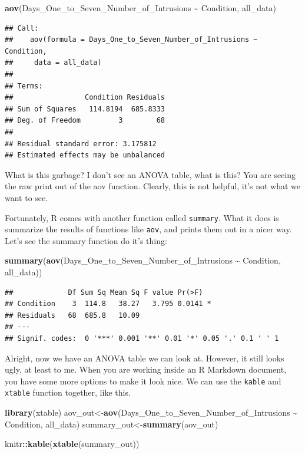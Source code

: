 \documentclass[
]{book}
\newenvironment{Shaded}{\begin{snugshade}}{\end{snugshade}}
\newcommand{\FunctionTok}[1]{\textcolor[rgb]{0.13,0.29,0.53}{\textbf{#1}}}
\newcommand{\NormalTok}[1]{#1}
\newcommand{\OtherTok}[1]{\textcolor[rgb]{0.56,0.35,0.01}{#1}}
\newcommand{\SpecialCharTok}[1]{\textcolor[rgb]{0.81,0.36,0.00}{\textbf{#1}}}
\begin{document}
\begin{Shaded}
\begin{Highlighting}[]
\FunctionTok{aov}\NormalTok{(Days\_One\_to\_Seven\_Number\_of\_Intrusions }\SpecialCharTok{\textasciitilde{}}\NormalTok{ Condition, all\_data)}
\end{Highlighting}
\end{Shaded}

\begin{verbatim}
## Call:
##    aov(formula = Days_One_to_Seven_Number_of_Intrusions ~ Condition, 
##     data = all_data)
## 
## Terms:
##                 Condition Residuals
## Sum of Squares   114.8194  685.8333
## Deg. of Freedom         3        68
## 
## Residual standard error: 3.175812
## Estimated effects may be unbalanced
\end{verbatim}

What is this garbage? I don't see an ANOVA table, what is this? You are seeing the raw print out of the aov function. Clearly, this is not helpful, it's not what we want to see.

Fortunately, R comes with another function called \texttt{summary}. What it does is summarize the results of functions like \texttt{aov}, and prints them out in a nicer way. Let's see the summary function do it's thing:

\begin{Shaded}
\begin{Highlighting}[]
\FunctionTok{summary}\NormalTok{(}\FunctionTok{aov}\NormalTok{(Days\_One\_to\_Seven\_Number\_of\_Intrusions }\SpecialCharTok{\textasciitilde{}}\NormalTok{ Condition, all\_data))}
\end{Highlighting}
\end{Shaded}

\begin{verbatim}
##             Df Sum Sq Mean Sq F value Pr(>F)  
## Condition    3  114.8   38.27   3.795 0.0141 *
## Residuals   68  685.8   10.09                 
## ---
## Signif. codes:  0 '***' 0.001 '**' 0.01 '*' 0.05 '.' 0.1 ' ' 1
\end{verbatim}

Alright, now we have an ANOVA table we can look at. However, it still looks ugly, at least to me. When you are working inside an R Markdown document, you have some more options to make it look nice. We can use the \texttt{kable} and \texttt{xtable} function together, like this.

\begin{Shaded}
\begin{Highlighting}[]
\FunctionTok{library}\NormalTok{(xtable)}
\NormalTok{aov\_out}\OtherTok{\textless{}{-}}\FunctionTok{aov}\NormalTok{(Days\_One\_to\_Seven\_Number\_of\_Intrusions }\SpecialCharTok{\textasciitilde{}}\NormalTok{ Condition, all\_data)}
\NormalTok{summary\_out}\OtherTok{\textless{}{-}}\FunctionTok{summary}\NormalTok{(aov\_out)}

\NormalTok{knitr}\SpecialCharTok{::}\FunctionTok{kable}\NormalTok{(}\FunctionTok{xtable}\NormalTok{(summary\_out))}
\end{Highlighting}
\end{Shaded}
\end{document}
